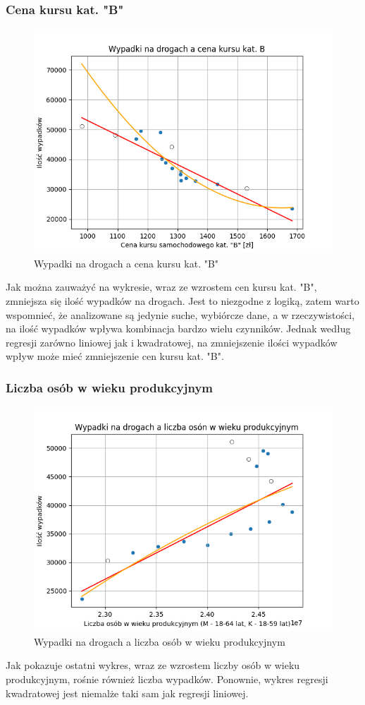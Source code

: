 \documentclass[10pt]{article}
\begin{document}
\subsubsection{Cena kursu kat. "B"}
\begin{figure}[h]
\begin{center}
\includegraphics[width=0.5\linewidth]{images/plots/kurs.png}
\caption{Wypadki na drogach a cena kursu kat. "B"}
\end{center}
\end{figure}
Jak można zauważyć na wykresie, wraz ze wzrostem cen kursu kat. "B", zmniejsza się ilość wypadków na drogach. Jest to niezgodne z logiką, zatem warto wspomnieć, że analizowane są jedynie suche, wybiórcze dane, a w rzeczywistości, na ilość wypadków wpływa kombinacja bardzo wielu czynników. Jednak według regresji zarówno liniowej jak i kwadratowej, na zmniejszenie ilości wypadków wpływ może mieć zmniejszenie cen kursu kat. "B".

\subsubsection{Liczba osób w wieku produkcyjnym}
\begin{figure}[h]
\begin{center}
\includegraphics[width=0.5\linewidth]{images/plots/ludzie.png}
\caption{Wypadki na drogach a liczba osób w wieku produkcyjnym}
\end{center}
\end{figure}
Jak pokazuje ostatni wykres, wraz ze wzrostem liczby osób w wieku produkcyjnym, rośnie również liczba wypadków. Ponownie, wykres regresji kwadratowej jest niemalże taki sam jak regresji liniowej.
\end{document}
